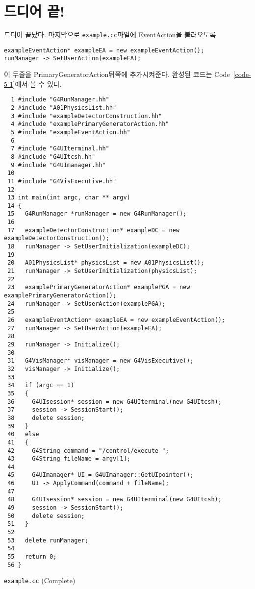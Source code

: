 \chapter{드디어 끝!}

\setcounter{code}{0}

드디어 끝났다. 마지막으로 \texttt{example.cc}파일에 EventAction을 불러오도록 
\begin{pc}
\begin{lstlisting}
exampleEventAction* exampleEA = new exampleEventAction();
runManager -> SetUserAction(exampleEA);
\end{lstlisting}
\end{pc}
이 두줄을 PrimaryGeneratorAction뒤쪽에 추가시켜준다. 완성된 코드는
Code~\ref{code-5-1}에서 볼 수 있다.

\begin{code}[p]
\begin{lstlisting}
  1 #include "G4RunManager.hh"
  2 #include "A01PhysicsList.hh"
  3 #include "exampleDetectorConstruction.hh"
  4 #include "examplePrimaryGeneratorAction.hh"
  5 #include "exampleEventAction.hh"
  6 
  7 #include "G4UIterminal.hh"
  8 #include "G4UItcsh.hh"
  9 #include "G4UImanager.hh"
 10 
 11 #include "G4VisExecutive.hh"
 12 
 13 int main(int argc, char ** argv)
 14 {
 15   G4RunManager *runManager = new G4RunManager();
 16 
 17   exampleDetectorConstruction* exampleDC = new exampleDetectorConstruction();
 18   runManager -> SetUserInitialization(exampleDC);
 19 
 20   A01PhysicsList* physicsList = new A01PhysicsList();
 21   runManager -> SetUserInitialization(physicsList);
 22 
 23   examplePrimaryGeneratorAction* examplePGA = new examplePrimaryGeneratorAction();
 24   runManager -> SetUserAction(examplePGA);
 25 
 26   exampleEventAction* exampleEA = new exampleEventAction();
 27   runManager -> SetUserAction(exampleEA);
 28 
 29   runManager -> Initialize();
 30 
 31   G4VisManager* visManager = new G4VisExecutive();
 32   visManager -> Initialize();
 33 
 34   if (argc == 1)
 35   {
 36     G4UIsession* session = new G4UIterminal(new G4UItcsh);
 37     session -> SessionStart();
 38     delete session;
 39   }
 40   else
 41   {
 42     G4String command = "/control/execute ";
 43     G4String fileName = argv[1];
 44 
 45     G4UImanager* UI = G4UImanager::GetUIpointer();
 46     UI -> ApplyCommand(command + fileName);
 47 
 48     G4UIsession* session = new G4UIterminal(new G4UItcsh);
 49     session -> SessionStart();
 50     delete session;
 51   }
 52 
 53   delete runManager;
 54 
 55   return 0;
 56 }
\end{lstlisting}
\caption{\texttt{example.cc} (Complete) \label{code-5-1}}
\end{code}

